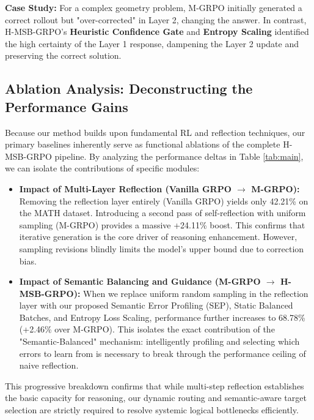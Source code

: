 \documentclass[letterpaper]{article}
\begin{document}
\textbf{Case Study:} For a complex geometry problem, M-GRPO initially generated a correct rollout but "over-corrected" in Layer 2, changing the answer. In contrast, H-MSB-GRPO's \textbf{Heuristic Confidence Gate} and \textbf{Entropy Scaling} identified the high certainty of the Layer 1 response, dampening the Layer 2 update and preserving the correct solution.

\subsection{Ablation Analysis: Deconstructing the Performance Gains}
Because our method builds upon fundamental RL and reflection techniques, our primary baselines inherently serve as functional ablations of the complete H-MSB-GRPO pipeline. By analyzing the performance deltas in Table \ref{tab:main}, we can isolate the contributions of specific modules:

\begin{itemize}
    \item \textbf{Impact of Multi-Layer Reflection (Vanilla GRPO $\rightarrow$ M-GRPO):} Removing the reflection layer entirely (Vanilla GRPO) yields only 42.21\% on the MATH dataset. Introducing a second pass of self-reflection with uniform sampling (M-GRPO) provides a massive +24.11\% boost. This confirms that iterative generation is the core driver of reasoning enhancement. However, sampling revisions blindly limits the model's upper bound due to correction bias.
    \item \textbf{Impact of Semantic Balancing and Guidance (M-GRPO $\rightarrow$ H-MSB-GRPO):} When we replace uniform random sampling in the reflection layer with our proposed Semantic Error Profiling (SEP), Static Balanced Batches, and Entropy Loss Scaling, performance further increases to 68.78\% (+2.46\% over M-GRPO). This isolates the exact contribution of the "Semantic-Balanced" mechanism: intelligently profiling and selecting which errors to learn from is necessary to break through the performance ceiling of naive reflection.
\end{itemize}
This progressive breakdown confirms that while multi-step reflection establishes the basic capacity for reasoning, our dynamic routing and semantic-aware target selection are strictly required to resolve systemic logical bottlenecks efficiently.
\end{document}
